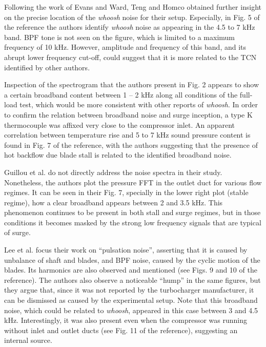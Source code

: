 Following the work of Evans and Ward, Teng and Homco \cite{teng2009investigation} obtained further insight on the precise location of the \emph{whoosh} noise for their setup. Especially, in Fig. 5 of the reference the authors identify \emph{whoosh} noise as appearing in the 4.5 to 7 kHz band. BPF tone is not seen on the figure, which is limited to a maximum frequency of 10 kHz. However, amplitude and frequency of this band, and its abrupt lower frequency cut-off, could suggest that it is more related to the TCN identified by other authors. 

Inspection of the spectrogram that the authors present in Fig. 2 appears to show a certain broadband content between 1 -- 2 kHz along all conditions of the full-load test, which would be more consistent with other reports of \emph{whoosh}. In order to confirm the relation between broadband noise and surge inception, a type K thermocouple was affixed very close to the compressor inlet. An apparent correlation between temperature rise and 5 to 7 kHz sound pressure content is found in Fig. 7 of the reference, with the authors suggesting that the presence of hot backflow due blade stall is related to the identified broadband noise.

Guillou et al. \cite{guillou2010characterization} do not directly address the noise spectra in their study. Nonetheless, the authors plot the pressure FFT in the outlet duct for various flow regimes. It can be seen in their Fig. 7, specially in the lower right plot (stable regime), how a clear broadband appears between 2 and 3.5 kHz. This phenomenon continues to be present in both stall and surge regimes, but in those conditions it becomes masked by the strong low frequency signals that are typical of surge.

Lee et al. \cite{lee2011control} focus their work on ``pulsation noise'', asserting that it is caused by unbalance of shaft and blades, and BPF noise, caused by the cyclic motion of the blades. Its harmonics are also observed and mentioned (see Figs. 9 and 10 of the reference). The authors also observe a noticeable ``hump'' in the same figures, but they argue that, since it was not reported by the turbocharger manufacturer, it can be dismissed as caused by the experimental setup. Note that this broadband noise, which could be related to \emph{whoosh}, appeared in this case between 3 and 4.5 kHz. Interestingly, it was also present even when the compressor was running without inlet and outlet ducts (see Fig. 11 of the reference), suggesting an internal source.


